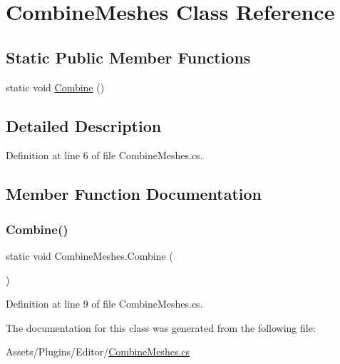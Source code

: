 \hypertarget{class_combine_meshes}{}\section{Combine\+Meshes Class Reference}
\label{class_combine_meshes}
\subsection*{Static Public Member Functions}
\begin{DoxyCompactItemize}
\item 
static void \mbox{\hyperlink{class_combine_meshes_afdc5e210d71e3b6dc400d2aa8d860ebb}{Combine}} ()
\end{DoxyCompactItemize}


\subsection{Detailed Description}


Definition at line 6 of file Combine\+Meshes.\+cs.



\subsection{Member Function Documentation}
\mbox{\label{class_combine_meshes_afdc5e210d71e3b6dc400d2aa8d860ebb}} 
\subsubsection{\texorpdfstring{Combine()}{Combine()}}
{\footnotesize\ttfamily static void Combine\+Meshes.\+Combine (\begin{DoxyParamCaption}{ }\end{DoxyParamCaption})\hspace{0.3cm}{\ttfamily [static]}}



Definition at line 9 of file Combine\+Meshes.\+cs.



The documentation for this class was generated from the following file\+:\begin{DoxyCompactItemize}
\item 
Assets/\+Plugins/\+Editor/\mbox{\hyperlink{_combine_meshes_8cs}{Combine\+Meshes.\+cs}}\end{DoxyCompactItemize}
